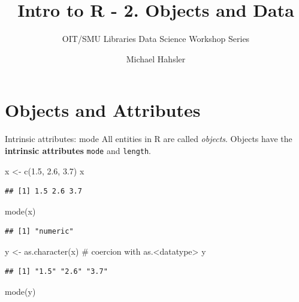 \documentclass[
  9pt,
  ignorenonframetext,
]{beamer}
\title{Intro to R - 2. Objects and Data}
\subtitle{OIT/SMU Libraries Data Science Workshop Series}
\author{Michael Hahsler}
\date{}
\institute{OIT, SMU}
\newenvironment{Shaded}{\begin{snugshade}}{\end{snugshade}}
\newcommand{\CommentTok}[1]{\textcolor[rgb]{0.50,0.62,0.50}{#1}}
\newcommand{\FloatTok}[1]{\textcolor[rgb]{0.75,0.75,0.82}{#1}}
\newcommand{\KeywordTok}[1]{\textcolor[rgb]{0.94,0.87,0.69}{#1}}
\newcommand{\NormalTok}[1]{\textcolor[rgb]{0.80,0.80,0.80}{#1}}
\newcommand{\StringTok}[1]{\textcolor[rgb]{0.80,0.58,0.58}{#1}}
\begin{document}
\frame{\titlepage}

\begin{frame}[allowframebreaks]
  \tableofcontents[hideallsubsections]
\end{frame}
\hypertarget{objects-and-attributes}{%
\section{Objects and Attributes}\label{objects-and-attributes}}

\begin{frame}[fragile]{Intrinsic attributes: mode}
\protect\hypertarget{intrinsic-attributes-mode}{}
All entities in R are called \emph{objects}. Objects have the
\textbf{intrinsic attributes} \texttt{mode} and \texttt{length}.

\vfill

\begin{Shaded}
\begin{Highlighting}[]
\NormalTok{x \textless{}{-}}\StringTok{ }\KeywordTok{c}\NormalTok{(}\FloatTok{1.5}\NormalTok{, }\FloatTok{2.6}\NormalTok{, }\FloatTok{3.7}\NormalTok{)}
\NormalTok{x}
\end{Highlighting}
\end{Shaded}

\begin{verbatim}
## [1] 1.5 2.6 3.7
\end{verbatim}

\begin{Shaded}
\begin{Highlighting}[]
\KeywordTok{mode}\NormalTok{(x)}
\end{Highlighting}
\end{Shaded}

\begin{verbatim}
## [1] "numeric"
\end{verbatim}

\begin{Shaded}
\begin{Highlighting}[]
\NormalTok{y \textless{}{-}}\StringTok{ }\KeywordTok{as.character}\NormalTok{(x)    }\CommentTok{\# coercion with as.\textless{}datatype\textgreater{}}
\NormalTok{y}
\end{Highlighting}
\end{Shaded}

\begin{verbatim}
## [1] "1.5" "2.6" "3.7"
\end{verbatim}

\begin{Shaded}
\begin{Highlighting}[]
\KeywordTok{mode}\NormalTok{(y)}
\end{Highlighting}
\end{Shaded}


\end{frame}
\end{document}
